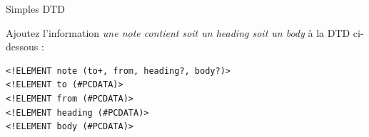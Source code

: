 \begin{frame}[containsverbatim]{Simples DTD}

\begin{exoblock}%
Ajoutez l'information
\textit{une note contient soit un heading soit un body} à la DTD ci-dessous :
\begin{lstlisting}[caption={Le memo}]
<!ELEMENT note (to+, from, heading?, body?)>
<!ELEMENT to (#PCDATA)>
<!ELEMENT from (#PCDATA)>
<!ELEMENT heading (#PCDATA)>
<!ELEMENT body (#PCDATA)>
\end{lstlisting}
\end{exoblock}


\end{frame}


